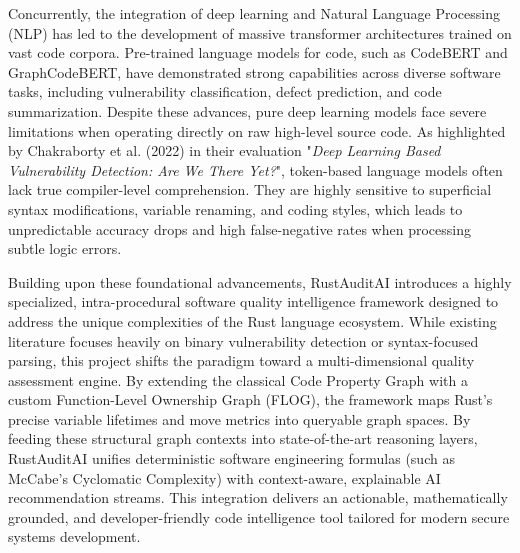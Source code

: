 Concurrently, the integration of deep learning and Natural Language Processing (NLP) has led to the development of massive transformer architectures trained on vast code corpora. Pre-trained language models for code, such as CodeBERT and GraphCodeBERT, have demonstrated strong capabilities across diverse software tasks, including vulnerability classification, defect prediction, and code summarization. Despite these advances, pure deep learning models face severe limitations when operating directly on raw high-level source code. As highlighted by Chakraborty et al. (2022) in their evaluation "\textit{Deep Learning Based Vulnerability Detection: Are We There Yet?}", token-based language models often lack true compiler-level comprehension. They are highly sensitive to superficial syntax modifications, variable renaming, and coding styles, which leads to unpredictable accuracy drops and high false-negative rates when processing subtle logic errors.

Building upon these foundational advancements, RustAuditAI introduces a highly specialized, intra-procedural software quality intelligence framework designed to address the unique complexities of the Rust language ecosystem. While existing literature focuses heavily on binary vulnerability detection or syntax-focused parsing, this project shifts the paradigm toward a multi-dimensional quality assessment engine. By extending the classical Code Property Graph with a custom Function-Level Ownership Graph (FLOG), the framework maps Rust's precise variable lifetimes and move metrics into queryable graph spaces. By feeding these structural graph contexts into state-of-the-art reasoning layers, RustAuditAI unifies deterministic software engineering formulas (such as McCabe’s Cyclomatic Complexity) with context-aware, explainable AI recommendation streams. This integration delivers an actionable, mathematically grounded, and developer-friendly code intelligence tool tailored for modern secure systems development.
